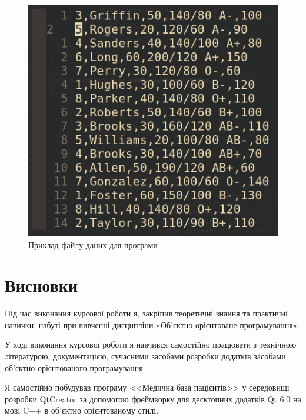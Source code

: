 \documentclass[oneside,14pt]{extarticle}
\begin{document}
\begin{figure}[H]
	\centering
	\includegraphics[scale=0.7]{23}
	\caption{Приклад файлу даних для програми}
\end{figure}

\section*{Висновки}
Під час виконання курсової роботи я, закріпив теоретичні знання та практичні навички, набуті при вивченні дисципліни «Об'єктно-орієнтоване програмування».

У ході виконання курсової роботи я навчився самостійно працювати з технічною літературою, документацією, сучасними засобами розробки додатків засобами об'єктно орієнтованого програмування.

Я самостійно побудував програму <<Медична база пацієнтів>> у середовищі розробки QtCreator за допомогою фреймворку для десктопних додатків Qt 6.0 на мові C++ в об'єктно орієнтованому стилі.
\end{document}
